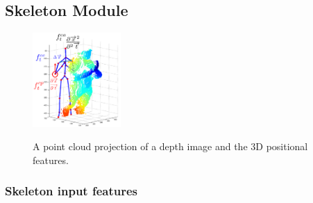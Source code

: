 \subsection{Skeleton Module}
\label{sec:skeleton_module}


\begin{figure}[t]
  \centering
  \includegraphics[width=0.3\textwidth]{images/point_cloud}\\
  \caption{
    A point cloud projection of a depth image and the 3D positional features.}
    \label{point_cloud}
\end{figure}


\subsubsection{Skeleton input features}

